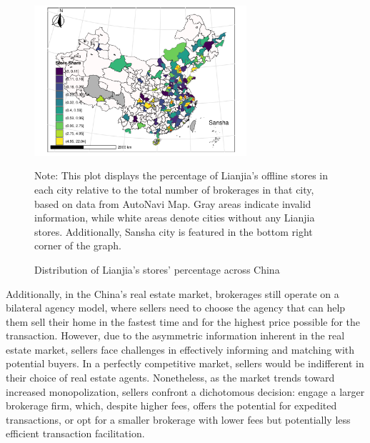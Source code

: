 \documentclass[11pt]{article}
\begin{document}
\begin{figure}
  \centering
  \includegraphics[width=0.7\textwidth]{../figures/distribution_of_cities_share.pdf}
  \caption{Distribution of Lianjia's stores' percentage across China}
  \label{fig:precise_proportion_contraction}
  Note: This plot displays the percentage of Lianjia's offline stores in each city relative to the total number of brokerages in that city, based on data from AutoNavi Map. Gray areas indicate invalid information, while white areas denote cities without any Lianjia stores. Additionally, Sansha city is featured in the bottom right corner of the graph.
\end{figure}

Additionally, in the China's real estate market, brokerages still operate on a bilateral agency model, where sellers need to choose the agency that can help them sell their home in the fastest time and for the highest price possible for the transaction. However, due to the asymmetric information inherent in the real estate market, sellers face challenges in effectively informing and matching with potential buyers. In a perfectly competitive market, sellers would be indifferent in their choice of real estate agents. Nonetheless, as the market trends toward increased monopolization, sellers confront a dichotomous decision: engage a larger brokerage firm, which, despite higher fees, offers the potential for expedited transactions, or opt for a smaller brokerage with lower fees but potentially less efficient transaction facilitation.
\end{document}
